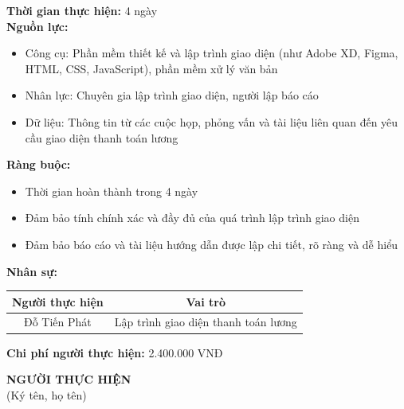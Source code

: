 {\begin{minipage}{\textwidth}
\begin{itemize}
    \end{itemize}
    \vspace{0.5cm}
    \noindent \textbf{Thời gian thực hiện:} 4 ngày \\
    \noindent \textbf{Nguồn lực:}
    \begin{itemize}
        \item Công cụ: Phần mềm thiết kế và lập trình giao diện (như Adobe XD, Figma, HTML, CSS, JavaScript), phần mềm xử lý văn bản
        \item Nhân lực: Chuyên gia lập trình giao diện, người lập báo cáo
        \item Dữ liệu: Thông tin từ các cuộc họp, phỏng vấn và tài liệu liên quan đến yêu cầu giao diện thanh toán lương
    \end{itemize}
    \vspace{0.5cm}
    \noindent \textbf{Ràng buộc:}
    \begin{itemize}
        \item Thời gian hoàn thành trong 4 ngày
        \item Đảm bảo tính chính xác và đầy đủ của quá trình lập trình giao diện
        \item Đảm bảo báo cáo và tài liệu hướng dẫn được lập chi tiết, rõ ràng và dễ hiểu
    \end{itemize}
    \vspace{0.5cm}
    \noindent \textbf{Nhân sự:}
    \begin{longtable}{|c|c|}
    \hline
    \textbf{Người thực hiện} & \textbf{Vai trò} \\
    \hline
    Đỗ Tiến Phát & Lập trình giao diện thanh toán lương \\
    \hline
    \end{longtable}
    \vspace{0.5cm}
    \noindent \textbf{Chi phí người thực hiện:} 2.400.000 VNĐ \\
    \vspace{1cm}
    \begin{flushleft}
        \hspace{8cm} \textbf{NGƯỜI THỰC HIỆN} \\
        \hspace{8.8cm} (Ký tên, họ tên) \\
        \vspace{1cm}
    \end{flushleft}
    \end{minipage}
}
% 
